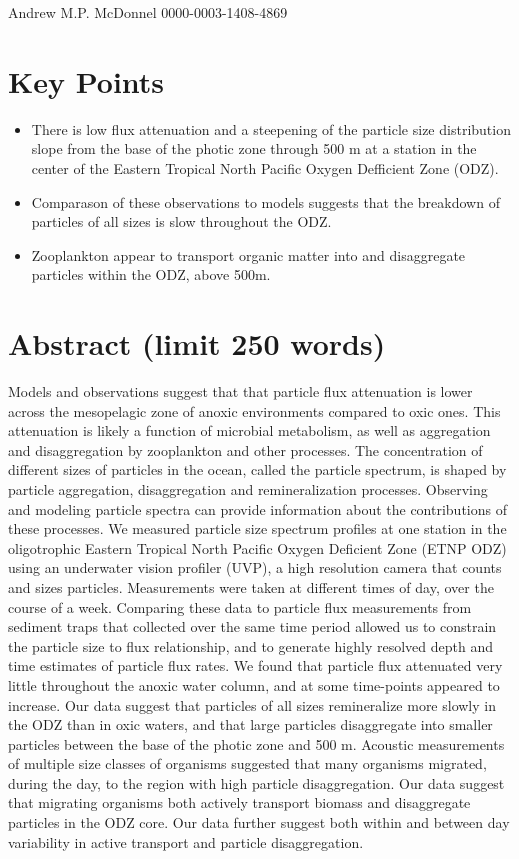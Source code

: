 \documentclass[]{article}
\begin{document}
Andrew M.P. McDonnel 0000-0003-1408-4869

\hypertarget{key-points}{%
\section{Key Points}\label{key-points}}

\begin{itemize}
\item
  There is low flux attenuation and a steepening of the particle size
  distribution slope from the base of the photic zone through 500 m at a
  station in the center of the Eastern Tropical North Pacific Oxygen
  Defficient Zone (ODZ).
\item
  Comparason of these observations to models suggests that the breakdown
  of particles of all sizes is slow throughout the ODZ.
\item
  Zooplankton appear to transport organic matter into and disaggregate
  particles within the ODZ, above 500m.
\end{itemize}

\hypertarget{abstract-limit-250-words}{%
\section{Abstract (limit 250 words)}\label{abstract-limit-250-words}}

Models and observations suggest that that particle flux attenuation is
lower across the mesopelagic zone of anoxic environments compared to
oxic ones. This attenuation is likely a function of microbial
metabolism, as well as aggregation and disaggregation by zooplankton and
other processes. The concentration of different sizes of particles in
the ocean, called the particle spectrum, is shaped by particle
aggregation, disaggregation and remineralization processes. Observing
and modeling particle spectra can provide information about the
contributions of these processes. We measured particle size spectrum
profiles at one station in the oligotrophic Eastern Tropical North
Pacific Oxygen Deficient Zone (ETNP ODZ) using an underwater vision
profiler (UVP), a high resolution camera that counts and sizes
particles. Measurements were taken at different times of day, over the
course of a week. Comparing these data to particle flux measurements
from sediment traps that collected over the same time period allowed us
to constrain the particle size to flux relationship, and to generate
highly resolved depth and time estimates of particle flux rates. We
found that particle flux attenuated very little throughout the anoxic
water column, and at some time-points appeared to increase. Our data
suggest that particles of all sizes remineralize more slowly in the ODZ
than in oxic waters, and that large particles disaggregate into smaller
particles between the base of the photic zone and 500 m. Acoustic
measurements of multiple size classes of organisms suggested that many
organisms migrated, during the day, to the region with high particle
disaggregation. Our data suggest that migrating organisms both actively
transport biomass and disaggregate particles in the ODZ core. Our data
further suggest both within and between day variability in active
transport and particle disaggregation.
\end{document}
